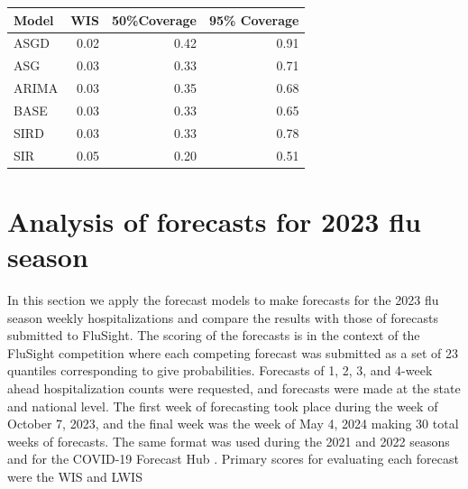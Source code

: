 \begin{table}[ht]
\centering
\begin{tabular}{lrrr}
Model & WIS & 50\%Coverage  & 95\% Coverage \\ 
  \hline
ASGD & 0.02 & 0.42 & 0.91 \\ 
  ASG & 0.03 & 0.33 & 0.71 \\ 
  ARIMA & 0.03 & 0.35 & 0.68 \\ 
  BASE & 0.03 & 0.33 & 0.65 \\ 
  SIRD & 0.03 & 0.33 & 0.78 \\ 
  SIR & 0.05 & 0.20 & 0.51 \\
\end{tabular}
\end{table}































\section{Analysis of forecasts for 2023 flu season}
\label{sec:analysis}

In this section we apply the forecast models to make forecasts for the 2023 
flu season weekly hospitalizations and compare the results with those of 
forecasts submitted to FluSight. The scoring of the forecasts is in the 
context of the FluSight competition where each competing forecast was 
submitted as a set of 23 quantiles corresponding to give probabilities.
Forecasts of 1, 2, 3, and 4-week ahead hospitalization counts were requested, 
and forecasts were made at the state and national level. The first week of 
forecasting took place during the week of October 7, 2023, and the final week 
was the week of May 4, 2024 making 30 total weeks of forecasts.
 The same format was used during the 2021 and 2022 seasons and for the 
 COVID-19 Forecast Hub \cite[]{mathis2024evaluation, bracher2021evaluating}. 
 Primary scores for evaluating each forecast were the WIS and LWIS






